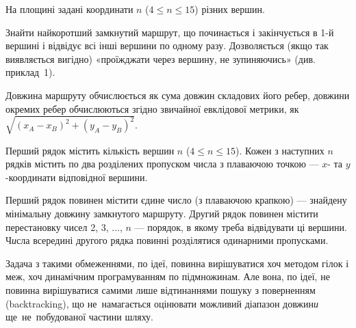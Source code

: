 ﻿На площині задані координати $n$ ($4\leqslant n\leqslant 15$) різних вершин.

Знайти найкоротший замкнутий маршрут, що починається і закінчується в 1-й вершині і відвідує всі інші вершини по одному разу. Дозволяється (якщо так виявляється вигідно) «проїжджати через вершину, не зупиняючись» (див. приклад~1).

Довжина маршруту обчислюється як сума довжин складових його ребер, довжини окремих ребер обчислюються згідно звичайної евклідової метрики, як $\sqrt{(x_A-x_B)^2+(y_A-y_B)^2}$.

\InputFile
Перший рядок містить кількість вершин $n$ ($4\leqslant n\leqslant 15$). Кожен з наступних $n$ рядків містить по два розділених пропуском числа з плаваючою точкою --- $x$- та $y$-координати відповідної вершини.

\OutputFile
Перший рядок повинен містити єдине число (з плаваючою крапкою) — знайдену мінімальну довжину замкнутого маршруту. Другий рядок повинен містити перестановку чисел 2, 3, ..., $n$ --- порядок, в якому треба відвідувати ці вершини. Ч{\it и}сла всередині другого рядка повинні розділятися одинарними пропусками. 

\Examples
\begin{example}
\end{example}

\Note
Задача з такими обмеженнями, по ідеї, повинна вирішуватися хоч методом гілок і меж, хоч динамічним програмуванням по підмножинам. Але вона, по ідеї, не повинна вирішуватися самими лише відтинаннями пошуку з поверненням (backtracking), що не~намагається оцінювати можливий діапазон довжин{\it и} ще~не~побудованої частини шляху.
